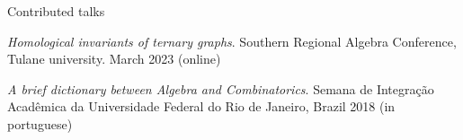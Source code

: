\documentclass[12pt]{resume} %
\begin{document}
\begin{rSection}{Contributed talks}
    \item \textit{Homological invariants of ternary graphs}. Southern Regional Algebra Conference, Tulane university. March 2023 (online)
    \item \textit{A brief dictionary between Algebra and Combinatorics}. Semana de Integração Acadêmica da Universidade Federal do Rio de Janeiro, Brazil 2018 (in portuguese)
    
\end{rSection}
\end{document}
